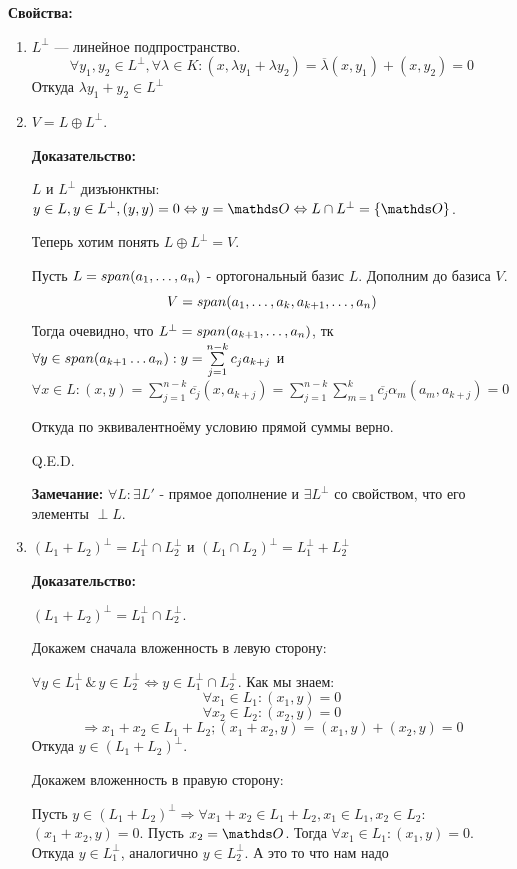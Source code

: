 \textbf{Свойства:}
\begin{enumerate}
    \item $L^{\perp}$ --- линейное подпространство. 
    $$\forall y_1,y_2 \in L^{\perp}, \forall \lambda \in K: (x,\lambda y_1 + \lambda y_2) = \overline{\lambda} (x,y_1) + (x,y_2) = 0$$
    Откуда $\lambda y_1  + y_2 \in L^{\perp}$

    \item $V = L \oplus L^{\perp}$. 

    \textbf{Доказательство:}

    $L$ и $L^\perp$ дизъюнктны: $y\in L, y \in L^\perp, (y,y) = 0 \Leftrightarrow y =\zero \Leftrightarrow L \cap L^\perp = \{\zero\}$. 
    
     Теперь хотим понять $L \oplus L^{\perp} = V$. 
     
     Пусть $L = span (a_1,\ldots,a_n)$ - ортогональный базис $L$. Дополним до базиса $V$. $$V = span(a_1,\ldots,a_k,a_{k+1},\ldots, a_n)$$
    Тогда очевидно, что $L^\perp = span (a_{k+1}, \ldots,a_n)$, тк $\forall y \in span(a_{k+1}\ldots a_n):y = \sum\limits_{j=1}^{n-k} c_j a_{k+j}$ и $\forall x\in L: (x,y) = \sum\limits_{j=1}^{n-k}\overline{c_j}(x, a_{k+j}) = \sum\limits_{j=1}^{n-k}\sum\limits_{m=1}^k \overline{c_j}\alpha_m (a_m,a_{k+j})=0$

    Откуда по эквивалентноёму условию прямой суммы верно.

    \hfill Q.E.D.

    \textbf{Замечание:} $\forall L: \exists L'$ - прямое дополнение и $\exists L^{\perp}$ со свойством, что его элементы $\perp L$. 

    \item $(L_1+L_2)^\perp = L_1^\perp \cap L_2^\perp$ и $(L_1 \cap L_2)^\perp = L_1^{\perp}+ L_2^{\perp}$

    \textbf{Доказательство:}

    $(L_1+L_2)^{\perp} = L_1^{\perp} \cap L_2^{\perp}$.

    Докажем сначала вложенность в левую сторону:

    $\forall  y \in L_1^\perp \, \&\, y\in L_2^\perp \Leftrightarrow y\in L_1^\perp \cap L_2^\perp$. Как мы знаем:
    $$\forall x_1 \in L_1: (x_1,y)=0$$
    $$\forall x_2 \in L_2: (x_2,y)=0$$
    $$\Rightarrow x_1 + x_2 \in L_1 + L_2; (x_1 + x_2, y) = (x_1,y) + (x_2,y)=0$$
    Откуда $y\in (L_1+L_2)^\perp$.

    Докажем вложенность в правую сторону:

    Пусть $y \in (L_1 + L_2)^\perp \Rightarrow \forall x_1 + x_2 \in L_1 + L_2,x_1 \in L_1, x_2 \in L_2$: $(x_1+x_2,y)=0$. Пусть $x_2 = \zero$. Тогда $\forall x_1 \in L_1: (x_1 , y)=0$. Откуда $y \in L_1^\perp$, аналогично $y \in L_2^\perp$. А это то что нам надо


\end{enumerate}

